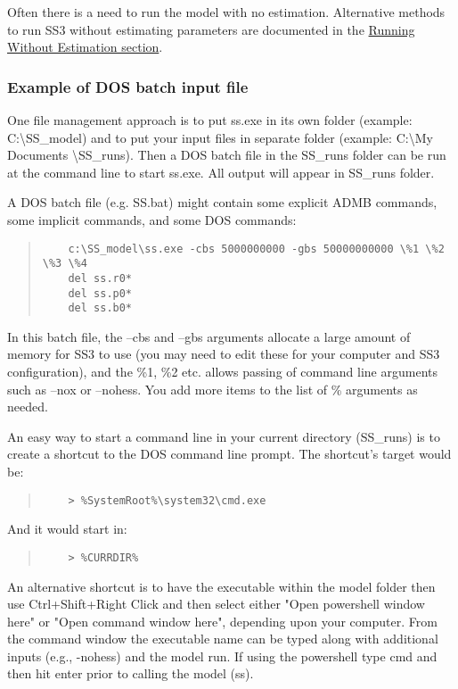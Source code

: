 Often there is a need to run the model with no estimation. Alternative methods to run SS3 without estimating parameters are documented in the \hyperlink{NoEst}{Running Without Estimation section}. 

\subsubsection{Example of DOS batch input file}
One file management approach is to put ss.exe in its own folder (example:  C:\textbackslash SS\_model) and to put your input files in separate folder (example:  C:\textbackslash My Documents \textbackslash SS\_runs).  Then a DOS batch file in the SS\_runs folder can be run at the command line to start ss.exe.  All output will appear in SS\_runs folder.

A DOS batch file (e.g. SS.bat) might contain some explicit ADMB commands, some implicit commands, and some DOS commands:

\begin{quote}
	\begin{verbatim}
	c:\SS_model\ss.exe -cbs 5000000000 -gbs 50000000000 \%1 \%2 \%3 \%4 
	del ss.r0*
	del ss.p0*
	del ss.b0*
	\end{verbatim}
\end{quote}


In this batch file, the –cbs and –gbs arguments allocate a large amount of memory for SS3 to use (you may need to edit these for your computer and SS3 configuration), and the \%1, \%2 etc. allows passing of command line arguments such as –nox or –nohess.  You add more items to the list of \% arguments as needed.

An easy way to start a command line in your current directory (SS\_runs) is to create a shortcut to the DOS command line prompt.  The shortcut’s target would be:

\begin{quote}
	\begin{verbatim}
	> %SystemRoot%\system32\cmd.exe
	\end{verbatim}
\end{quote}


\noindent And it would start in:
\begin{quote}
	\begin{verbatim}
	> %CURRDIR%
	\end{verbatim}
\end{quote}

An alternative shortcut is to have the executable within the model folder then use Ctrl+Shift+Right Click and then select either "Open powershell window here" or "Open command window here", depending upon your computer.  From the command window the executable name can be typed along with additional inputs (e.g., -nohess) and the model run.  If using the powershell type cmd and then hit enter prior to calling the model (ss). 


